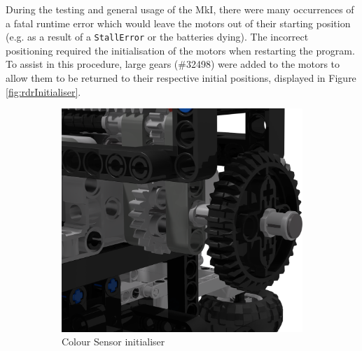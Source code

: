 \documentclass{report}
\newcommand{\legopiece}[1]{(\##1)}
\begin{document}
	During the testing and general usage of the MkI, there were many occurrences of a fatal runtime error which would leave the motors out of their starting position (e.g. as a result of a \lstinline|StallError| or the batteries dying). The incorrect positioning required the initialisation of the motors when restarting the program. To assist in this procedure, large gears \legopiece{32498} were added to the motors to allow them to be returned to their respective initial positions, displayed in Figure \ref{fig:rdrInitialiser}.
	
	\begin{figure}[H]
		\centering
		\begin{subfigure}[b]{0.25\textwidth}
			\includegraphics[width=\textwidth]{Resources/Images/rdrInitialiser1.png}
			\caption{Colour Sensor initialiser}
			\label{fig:rdrInitialiser1}
		\end{subfigure}
		\hspace{10mm}
		\begin{subfigure}[b]{0.25\textwidth}

\end{subfigure}
\end{figure}
\end{document}
